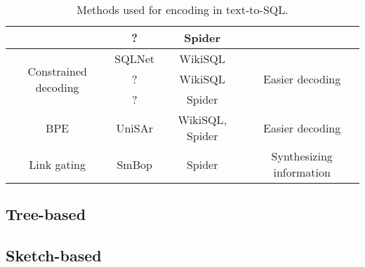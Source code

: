 \begin{table}
\begin{tabular}{|c|c|c|c|}
                                                                   & ?                   & Spider
                                                                   &                                                                                                                                            \\
        \hline
        \multirow{3}{*}{Constrained decoding}                      & SQLNet              & WikiSQL                   & \multirow{3}{*}{Easier decoding
        }                                                                                                                                                                                                       \\
                                                                   & ?                   & WikiSQL
                                                                   &                                                                                                                                            \\
                                                                   & ?                   & Spider
                                                                   &                                                                                                                                            \\
        \hline
        BPE                                                        & UniSAr              & WikiSQL, Spider           & Easier decoding
        \\
        \hline
        Link gating                                                & SmBop               & Spider                    & Synthesizing information                                                                 \\
        \hline
    \end{tabular}
    \caption{Methods used for encoding in text-to-SQL.}
    \label{tab:methods}
\end{table}

\subsection{Tree-based}

\subsection{Sketch-based}

